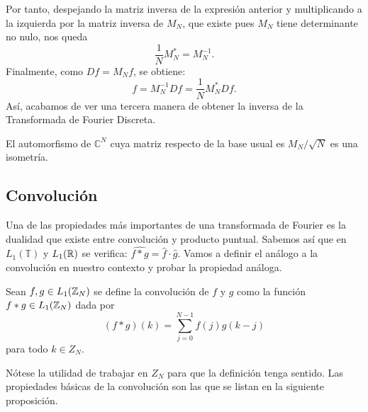 \documentclass{article}
\begin{document}
    Por tanto, despejando la matriz inversa de la expresión anterior y multiplicando a la izquierda por la matriz inversa de $M_N$, que existe pues $M_N$ tiene determinante no nulo, nos queda
\[
    \frac{1}{N}M_N^{\ast} = M_N^{-1}.
\]
Finalmente, como $Df = M_N f$, se obtiene:
\[
    f = M_N^{-1}Df = \frac{1}{N}M_N^{\ast}Df.
\]
Así, acabamos de ver una tercera manera de obtener la inversa de la Transformada de Fourier Discreta.

\begin{corollary} \label{cor:isometria}
    El automorfismo de $\mathbb{C}^N$ cuya matriz respecto de la base usual es $M_N / \sqrt{N}$ es una isometría.
\end{corollary}

\subsection{Convolución}
Una de las propiedades más importantes de una transformada de Fourier es la dualidad que existe entre convolución y producto puntual. Sabemos así que en $L_1(\mathbb{T})$ y $ L_1(\mathbb{R})$ se verifica: $\widehat{f*g}= \hat{f} \cdot \hat{g}$. Vamos a definir el análogo a la convolución en nuestro contexto y probar la propiedad análoga.

\begin{definition}
Sean $f,g \in L_1(\mathbb{Z}_N)$ se define la convolución de $f$ y $g$ como la función $f \ast g \in L_1(\mathbb{Z}_N)$ dada por
\[
(f\ast g)(k)=\sum_{j=0}^{N-1}f(j)g(k-j)
\]
para todo $k \in Z_N$.
\end{definition}

Nótese la utilidad de trabajar en $Z_N$ para que la definición tenga sentido. Las propiedades básicas de la convolución son las que se listan en  la siguiente proposición.
\end{document}
